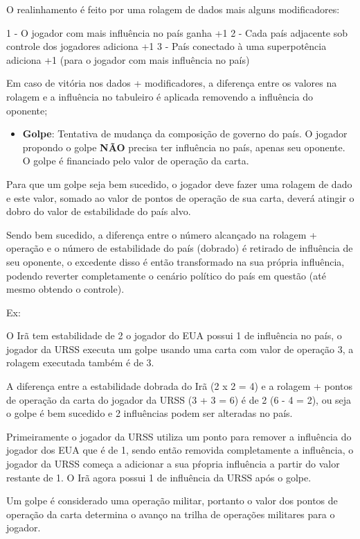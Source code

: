 \documentclass[11pt]{article}
\begin{document}
O realinhamento é feito por uma rolagem de dados mais alguns modificadores:

1 - O jogador com mais influência no país ganha +1
2 - Cada país adjacente sob controle dos jogadores adiciona +1
3 - País conectado à uma superpotência adiciona +1 (para o jogador com mais influência no país)

Em caso de vitória nos dados + modificadores, a diferença entre os valores na rolagem e a influência no tabuleiro é aplicada removendo a influência do oponente;

\begin{itemize}
\item \textbf{Golpe}: Tentativa de mudança da composição de governo do país. O jogador propondo o golpe \textbf{NÃO} precisa ter influência no país, apenas seu oponente. O golpe é financiado pelo valor de operação da carta.
\end{itemize}

Para que um golpe seja bem sucedido, o jogador deve fazer uma rolagem de dado e este valor, somado ao valor de pontos de operação de sua carta, deverá atingir o dobro do valor de estabilidade do país alvo.

Sendo bem sucedido, a diferença entre o número alcançado na rolagem + operação e o número de estabilidade do país (dobrado) é retirado de influência de seu oponente, o excedente disso é então transformado na
sua própria influência, podendo reverter completamente o cenário político do país em questão (até mesmo obtendo o controle).

Ex:

O Irã tem estabilidade de 2 o jogador do EUA possui 1 de influência no país, o jogador da URSS executa um golpe usando uma carta com valor de operação 3, a rolagem executada também é de 3.

A diferença entre a estabilidade dobrada do Irã (2 x 2 = 4) e a rolagem + pontos de operação da carta do jogador da URSS (3 + 3 = 6) é de 2 (6 - 4 = 2), ou seja o golpe é bem sucedido e 2 influências podem ser alteradas no
país.

Primeiramente o jogador da URSS utiliza um ponto para remover a influência do jogador dos EUA que é de 1, sendo então removida completamente a influência, o jogador da URSS começa a adicionar a sua pŕopria
influência a partir do valor restante de 1. O Irã agora possui 1 de influência da URSS após o golpe.

Um golpe é considerado uma operação militar, portanto o valor dos pontos de operação da carta determina o avanço na trilha de operações militares para o jogador.
\end{document}

